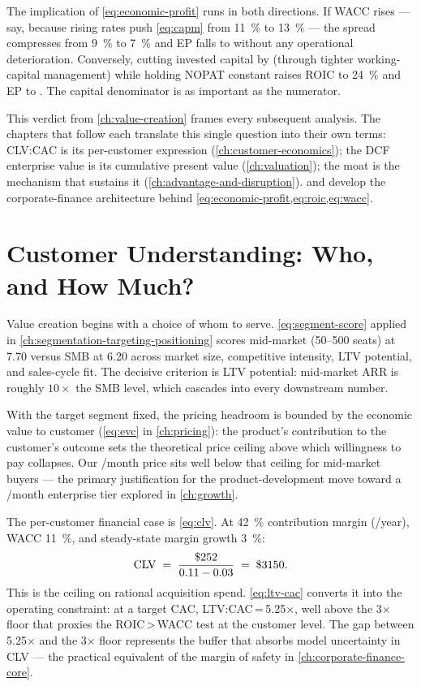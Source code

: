 The implication of \cref{eq:economic-profit} runs in both directions. If WACC rises --- say,
because rising rates push \cref{eq:capm} from \qty{11}{\percent} to \qty{13}{\percent} ---
the spread compresses from \qty{9}{\percent} to \qty{7}{\percent} and EP falls to 
without any operational deterioration. Conversely, cutting invested capital by 
(through tighter working-capital management) while holding NOPAT constant raises ROIC to
\qty{24}{\percent} and EP to . The capital denominator is as important as the
numerator.

This verdict from \cref{ch:value-creation} frames every subsequent analysis. The chapters
that follow each translate this single question into their own terms: CLV:CAC is its
per-customer expression (\cref{ch:customer-economics}); the DCF enterprise value is its
cumulative present value (\cref{ch:valuation}); the moat is the mechanism that sustains it
(\cref{ch:advantage-and-disruption}). \textcite{brealey2020} and \textcite{damodaran2012}
develop the corporate-finance architecture behind \cref{eq:economic-profit,eq:roic,eq:wacc}.

\section{Customer Understanding: Who, and How Much?}\label{sec:capstone-customer}

Value creation begins with a choice of whom to serve. \cref{eq:segment-score} applied in
\cref{ch:segmentation-targeting-positioning} scores mid-market (50--500 seats) at 7.70
versus SMB at 6.20 across market size, competitive intensity, LTV potential, and sales-cycle
fit. The decisive criterion is LTV potential: mid-market ARR is roughly \(10\times\) the
SMB level, which cascades into every downstream number.

With the target segment fixed, the pricing headroom is bounded by the economic value to
customer (\cref{eq:evc} in \cref{ch:pricing}): the product's contribution to the
customer's outcome sets the theoretical price ceiling above which willingness to pay
collapses. Our /month price sits well below that ceiling for mid-market buyers ---
the primary justification for the product-development move toward a /month enterprise
tier explored in \cref{ch:growth}.

The per-customer financial case is \cref{eq:clv}. At \qty{42}{\percent} contribution margin
(/year), WACC \qty{11}{\percent}, and steady-state margin growth \qty{3}{\percent}:
\[
  \mathrm{CLV} \;=\; \frac{\$\num{252}}{0.11 - 0.03} \;=\; \$\num{3150}.
\]
This is the ceiling on rational acquisition spend. \cref{eq:ltv-cac} converts it into the
operating constraint: at a  target CAC, LTV:CAC\,=\,5.25×, well above the
3× floor that proxies the ROIC\,>\,WACC test at the customer level. The gap between
5.25× and the 3× floor represents the buffer that absorbs model uncertainty in CLV ---
the practical equivalent of the margin of safety in \cref{ch:corporate-finance-core}.

